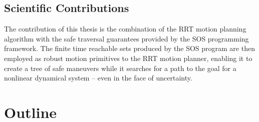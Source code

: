 
\subsection{Scientific Contributions}

The contribution of this thesis is the combination of the \ac{RRT} motion
planning algorithm with the safe traversal guarantees provided by the \ac{SOS}
programming framework. The finite time reachable sets produced by the \ac{SOS}
program are then employed as robust motion primitives to the \ac{RRT} motion
planner, enabling it to create a tree of safe maneuvers while it searches for a
path to the goal for a nonlinear dynamical system -- even in the face of
uncertainty.


\section{Outline}

